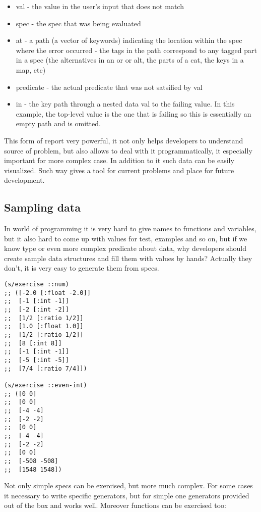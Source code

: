 \begin{itemize}
\item val - the value in the user’s input that does not match
\item spec - the spec that was being evaluated
\item at - a path (a vector of keywords) indicating the location within the spec where
the error occurred - the tags in the path correspond to any tagged part in a
spec (the alternatives in an or or alt, the parts of a cat, the keys in a map,
etc)
\item predicate - the actual predicate that was not satsified by val
\item in - the key path through a nested data val to the failing value. In this
example, the top-level value is the one that is failing so this is essentially
an empty path and is omitted.

\end{itemize}

This form of report very powerful, it not only helps developers to understand
source of problem, but also allows to deal with it programmatically, it
especially important for more complex case. In addition to it such data can be
easily visualized. Such way gives a tool for current problems and place for
future development.

\subsection{Sampling data}
\label{sec:samplingdata}
In world of programming it is very hard to give names to functions and
variables, but it also hard to come up with values for test, examples and so on,
but if we know type or even more complex predicate about data, why developers
should create sample data structures and fill them with values by hands?
Actually they don't, it is very easy to generate them from specs.

\begin{verbatim}
(s/exercise ::num)
;; ([-2.0 [:float -2.0]]
;;  [-1 [:int -1]]
;;  [-2 [:int -2]]
;;  [1/2 [:ratio 1/2]]
;;  [1.0 [:float 1.0]]
;;  [1/2 [:ratio 1/2]]
;;  [8 [:int 8]]
;;  [-1 [:int -1]]
;;  [-5 [:int -5]]
;;  [7/4 [:ratio 7/4]])

(s/exercise ::even-int)
;; ([0 0]
;;  [0 0]
;;  [-4 -4]
;;  [-2 -2]
;;  [0 0]
;;  [-4 -4]
;;  [-2 -2]
;;  [0 0]
;;  [-508 -508]
;;  [1548 1548])
\end{verbatim}

Not only simple specs can be exercised, but more much complex. For some cases it
necessary to write specific generators, but for simple one generators provided
out of the box and works well. Moreover functions can be exercised too:

